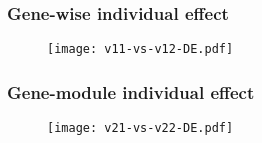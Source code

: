 \subsubsection{Gene-wise individual effect}
\begin{frame}
  \begin{figure}
    \centering
    \texttt{[image: v11-vs-v12-DE.pdf]}
  \end{figure}
\end{frame}
\subsubsection{Gene-module individual effect}
\begin{frame}
  \begin{figure}
    \centering
    \texttt{[image: v21-vs-v22-DE.pdf]}
  \end{figure}
\end{frame}
